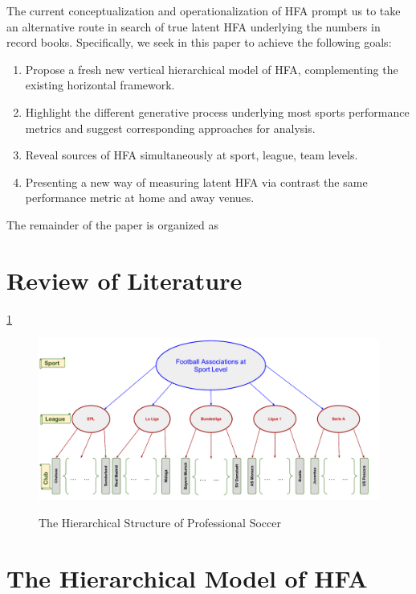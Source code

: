 \documentclass[USenglish]{article}
\begin{document}
The current conceptualization and operationalization of HFA prompt us to take an alternative route in search of true latent HFA underlying the numbers in record books. Specifically, we seek in this paper to achieve the following goals: 

\begin{enumerate}
\item  Propose a fresh new vertical hierarchical model of HFA, complementing the existing horizontal framework.
 

\item Highlight the different generative process underlying most sports performance metrics and suggest corresponding approaches for analysis.
\item Reveal sources of HFA simultaneously at sport, league, team levels.
\item Presenting a new way of measuring latent HFA via contrast the same performance metric at home and away venues. 
\end{enumerate}

The remainder of the paper is organized as 
 
\section{Review of Literature} 

\ref{fig21}

\begin{figure}
\caption{The Hierarchical Structure of Professional Soccer }
{\includegraphics[width=1.0\linewidth]{HFA_22}}
\label{fig21}
\end{figure} 
 

\section{The Hierarchical Model of HFA} 
\end{document}
